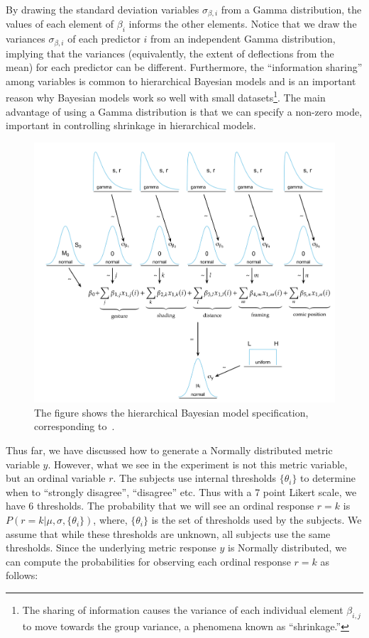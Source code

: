 By drawing the standard deviation variables $\sigma_{\beta, i}$ from a Gamma distribution, the values of each element of $\beta_i$ informs the other elements. Notice that we draw the variances $\sigma_{\beta, i}$ of each predictor $i$ from an independent Gamma distribution, implying that the variances (equivalently, the extent of deflections from the mean) for each predictor can be different. Furthermore, the ``information sharing'' among variables is common to hierarchical Bayesian models and is an important reason why Bayesian models work so well with small datasets\footnote{The sharing of information causes the variance of each individual element $\beta_{i,j}$ to move towards the group variance, a phenomena known as ``shrinkage.'' }. The main advantage of using a Gamma distribution is that we can specify a non-zero mode, important in controlling shrinkage in hierarchical models.

\begin{figure}
 \includegraphics[width=\textwidth]{./figures/generative_model.pdf}
 \caption{The figure shows the hierarchical Bayesian model specification, corresponding to~.}
 \label{fig:generative-main}
\end{figure}

Thus far, we have discussed how to generate a Normally distributed metric variable $y$. However, what we see in the experiment is not this metric variable, but an ordinal variable $r$. The subjects use internal thresholds $\{\theta_i\}$ to determine when to ``strongly disagree'', ``disagree'' etc. Thus with a 7 point Likert scale, we have 6 thresholds. The probability that we will see an ordinal response $r=k$ is $P(r=k | \mu, \sigma, \{\theta_i\})$, where, $\{\theta_i\}$ is the set of thresholds used by the subjects. We assume that while these thresholds are unknown, all subjects use the same thresholds. Since the underlying metric response $y$ is Normally distributed, we can compute the probabilities for observing each ordinal response $r=k$ as follows:

